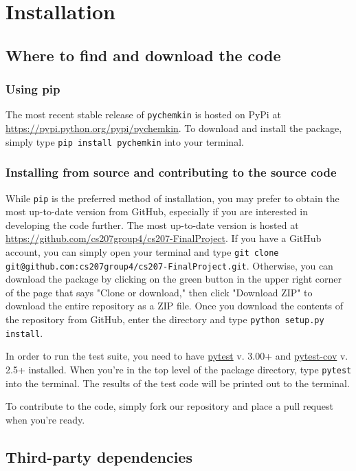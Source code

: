 \documentclass[12pt]{article}
\begin{document}
\section{Installation}

\subsection{Where to find and download the code}
\subsubsection{Using pip}
The most recent stable release of \texttt{pychemkin} is hosted on PyPi at \url{https://pypi.python.org/pypi/pychemkin}. To download and install the package, simply type 
\texttt{pip install pychemkin} into your terminal.
\subsubsection{Installing from source and contributing to the source code}
While \texttt{pip} is the preferred method of installation, you may prefer to obtain the most up-to-date version from GitHub, especially if you are interested in developing the code further. The most up-to-date version is hosted at \url{https://github.com/cs207group4/cs207-FinalProject}. If you have a GitHub account, you can simply open your terminal and type {\tt git clone git@github.com:cs207group4/cs207-FinalProject.git}. Otherwise, you can download the package by clicking on the green button in the upper right corner of the page that says "Clone or download," then click "Download ZIP" to download the entire repository as a ZIP file. Once you download the contents of the repository from GitHub, enter the directory and type {\tt python setup.py install}.

In order to run the test suite, you need to have \href{https://docs.pytest.org/en/latest/}{pytest} v. 3.00+ and \href{https://pypi.python.org/pypi/pytest-cov}{pytest-cov} v. 2.5+ installed. When you're in the top level of the package directory, type {\tt pytest} into the terminal. The results of the test code will be printed out to the terminal.

To contribute to the code, simply fork our repository and place a pull request when you're ready. 
 \newline

\subsection{Third-party dependencies}
\end{document}
